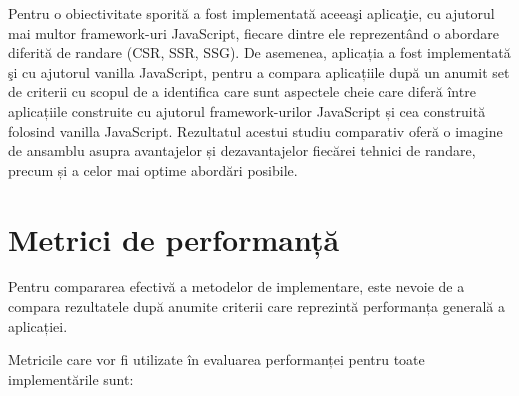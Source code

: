\documentclass[12pt, a4paper]{report}
\begin{document}
Pentru o obiectivitate sporită a fost implementată aceea\c si aplica\c tie, cu ajutorul mai multor framework-uri JavaScript, fiecare dintre ele reprezent\^and o abordare diferit\u a de randare (CSR, SSR, SSG). De asemenea, aplicația a fost implementat\u a \c si cu ajutorul vanilla JavaScript, pentru a compara aplicațiile dup\u a un anumit set de criterii cu scopul de a identifica care sunt aspectele cheie care diferă între aplicațiile construite cu ajutorul framework-urilor JavaScript și cea construită folosind vanilla JavaScript. Rezultatul acestui studiu comparativ ofer\u a o imagine de ansamblu asupra avantajelor și dezavantajelor fiecărei tehnici de randare, precum și a celor mai optime abordări posibile.


\section{Metrici de performanță}

Pentru compararea efectivă a metodelor de implementare, este nevoie de a compara rezultatele după anumite criterii care reprezintă performanța generală a aplicației.

Metricile care vor fi utilizate în evaluarea performanței pentru toate implementările sunt:
\end{document}
